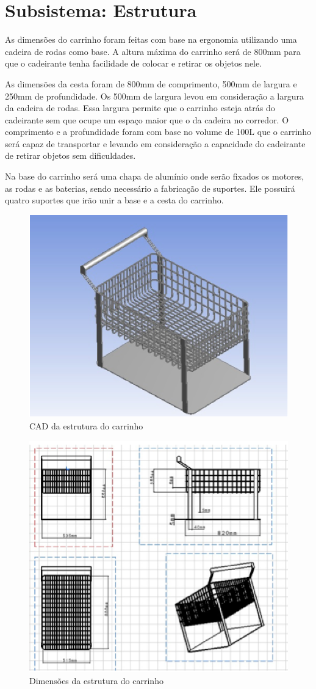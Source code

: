 \section{Subsistema: Estrutura} \label{sec:estrutura}

As dimensões do carrinho foram feitas com base na ergonomia utilizando uma cadeira de rodas como base. A altura máxima do carrinho será de 800mm para que o cadeirante tenha facilidade de colocar e retirar os objetos nele.

\par As dimensões da cesta foram de 800mm de comprimento, 500mm de largura e 250mm de profundidade. Os 500mm de largura levou em consideração a largura da cadeira de rodas. Essa largura permite que o carrinho esteja atrás do cadeirante sem que ocupe um espaço maior que o da cadeira no corredor. O comprimento e a profundidade foram com base no volume de 100L que o carrinho será capaz de transportar e levando em consideração a capacidade do cadeirante de retirar objetos sem dificuldades.

\par Na base do carrinho será uma chapa de alumínio onde serão fixados os motores, as rodas e as baterias, sendo necessário a fabricação de suportes. Ele possuirá quatro suportes que irão unir a base e a cesta do carrinho.

 \begin{figure}[ht]
		\centering
		\includegraphics[width=.4\textwidth]{figuras/CADcarrinho.png}
		\caption{CAD da estrutura do carrinho}
		\label{fig:CADcarrinho}
	\end{figure} 
    
 \begin{figure}[ht]
		\centering
		\includegraphics[width=.4\textwidth]{figuras/estrutura.png}
		\caption{Dimensões da estrutura do carrinho}
		\label{fig:estrutura}
	\end{figure} 

